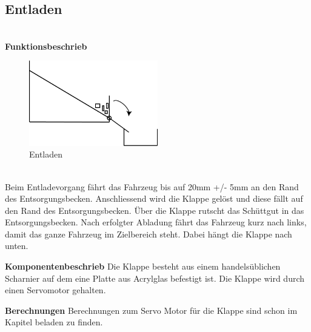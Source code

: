 \subsection{Entladen}

\\[0.2cm]
\textbf{Funktionsbeschrieb}\\[0.2cm]
\begin{figure}[H]
\centering
\includegraphics[width=0.5\textwidth]{03_Loesungskonzept/pictures/Entladen_Schraegbehaelter.png}
\caption{Entladen}
\end{figure}\\[0.2cm]

Beim Entladevorgang fährt das Fahrzeug bis auf 20mm +/- 5mm an den Rand des Entsorgungsbecken. Anschliessend wird die Klappe gelöst und diese fällt auf den Rand des Entsorgungsbecken. Über die Klappe rutscht das Schüttgut in das Entsorgungsbecken. Nach erfolgter Abladung fährt das Fahrzeug kurz nach links, damit das ganze Fahrzeug im Zielbereich steht. Dabei hängt die Klappe nach unten.

\textbf{Komponentenbeschrieb}
Die Klappe besteht aus einem handelsüblichen Scharnier auf dem eine Platte aus Acrylglas befestigt ist.
Die Klappe wird durch einen Servomotor gehalten.

\textbf{Berechnungen}
Berechnungen zum Servo Motor für die Klappe sind schon im Kapitel beladen zu finden.